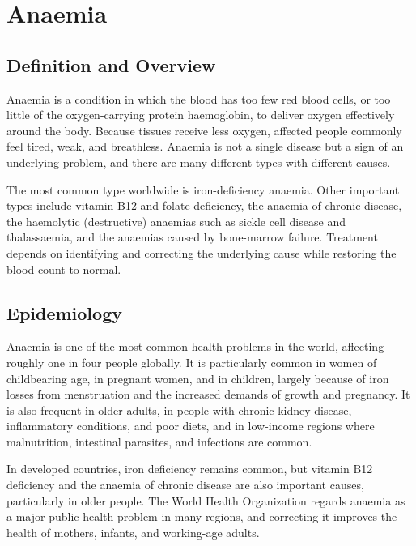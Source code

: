 \chapter{Anaemia}

\section*{Definition and Overview}
Anaemia is a condition in which the blood has too few red blood cells, or too little of the oxygen-carrying protein haemoglobin, to deliver oxygen effectively around the body. Because tissues receive less oxygen, affected people commonly feel tired, weak, and breathless. Anaemia is not a single disease but a sign of an underlying problem, and there are many different types with different causes.

The most common type worldwide is iron-deficiency anaemia. Other important types include vitamin B12 and folate deficiency, the anaemia of chronic disease, the haemolytic (destructive) anaemias such as sickle cell disease and thalassaemia, and the anaemias caused by bone-marrow failure. Treatment depends on identifying and correcting the underlying cause while restoring the blood count to normal.

\section*{Epidemiology}
Anaemia is one of the most common health problems in the world, affecting roughly one in four people globally. It is particularly common in women of childbearing age, in pregnant women, and in children, largely because of iron losses from menstruation and the increased demands of growth and pregnancy. It is also frequent in older adults, in people with chronic kidney disease, inflammatory conditions, and poor diets, and in low-income regions where malnutrition, intestinal parasites, and infections are common.

In developed countries, iron deficiency remains common, but vitamin B12 deficiency and the anaemia of chronic disease are also important causes, particularly in older people. The World Health Organization regards anaemia as a major public-health problem in many regions, and correcting it improves the health of mothers, infants, and working-age adults.

